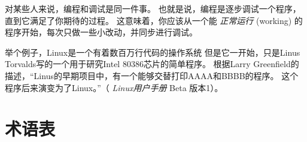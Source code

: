对某些人来说，编程和调试是同一件事。
也就是说，编程是逐步调试一个程序，直到它满足了你期待的过程。
这意味着，你应该从一个能 {\em 正常运行} (working) 的程序开始，每次只做一些小改动，并同步进行调试。


举个例子，Linux是一个有着数百万行代码的操作系统 但是它一开始，只是Linus
Torvalds写的一个用于研究Intel 80386芯片的简单程序。 根据Larry
Greenfield的描述，“Linus的早期项目中，有一个能够交替打印AAAA和BBBB的程序。
这个程序后来演变为了Linux。”（ {\em Linux用户手册} Beta 版本1）。


%
\section{术语表}

